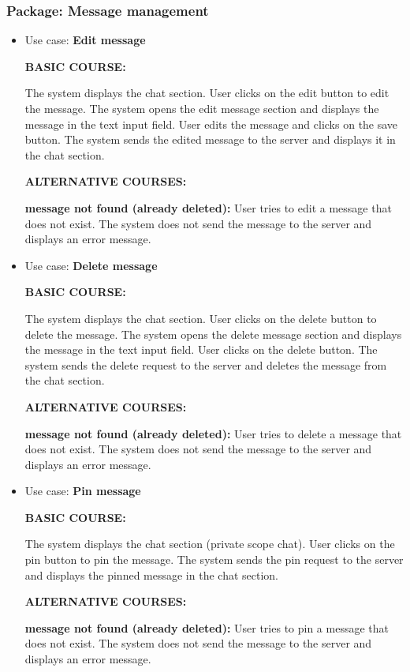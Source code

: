 \documentclass[]{VUMIFTemplateClass}
\begin{document}
\subsubsection{Package: Message management}
\begin{itemize}
    \item 
    Use case: \textbf{Edit message}

    \textbf{BASIC COURSE:}

    The system displays the chat section. User clicks on the edit button to edit the message. The system opens the edit message section and displays the message in the text input field. User edits the message and clicks on the save button. The system sends the edited message to the server and displays it in the chat section.

    \textbf{ALTERNATIVE COURSES:}

    \textbf{message not found (already deleted):}
    User tries to edit a message that does not exist. The system does not send the message to the server and displays an error message.

    \item
    Use case: \textbf{Delete message}   

    \textbf{BASIC COURSE:}

    The system displays the chat section. User clicks on the delete button to delete the message. The system opens the delete message section and displays the message in the text input field. User clicks on the delete button. The system sends the delete request to the server and deletes the message from the chat section.
    
    \textbf{ALTERNATIVE COURSES:}

    \textbf{message not found (already deleted):}
    User tries to delete a message that does not exist. The system does not send the message to the server and displays an error message.

    \item
    Use case: \textbf{Pin message}

    \textbf{BASIC COURSE:}

    The system displays the chat section (private scope chat). User clicks on the pin button to pin the message. The system sends the pin request to the server and displays the pinned message in the chat section.

    \textbf{ALTERNATIVE COURSES:}

    \textbf{message not found (already deleted):}
    User tries to pin a message that does not exist. The system does not send the message to the server and displays an error message.


\end{itemize}
\end{document}
